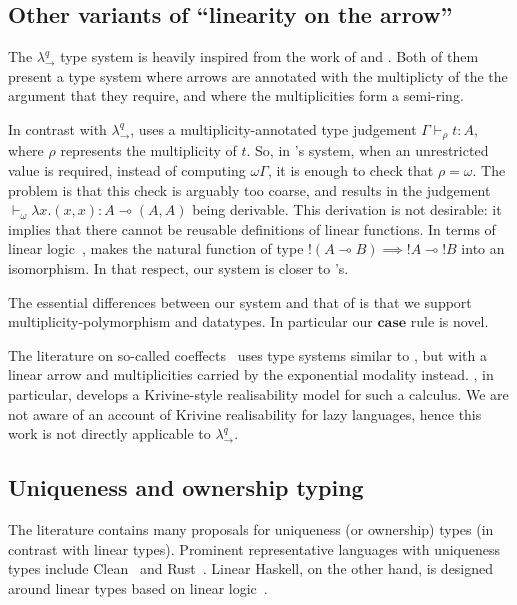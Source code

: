 \documentclass[acmsmall,screen]{acmart}\settopmatter{}
\newcommand\HaskeLL{Linear Haskell\xspace{}}
\newcommand\calc{{\ensuremath{λ^q_\to}}}
\begin{document}
\subsection{Other variants of ``linearity on the arrow''}
\label{sec:related-type-systems}

The \calc{} type system is heavily inspired from the work of
\citet{ghica_bounded_2014} and \citet{mcbride_rig_2016}. Both of them
present a type system where arrows are annotated with the multiplicty
of the the argument that they require, and where the multiplicities
form a semi-ring.

In contrast with \calc, \citeauthor{mcbride_rig_2016} uses a
multiplicity-annotated type judgement $Γ ⊢_ρ t : A$, where $ρ$
represents the multiplicity of $t$. So, in
\citeauthor{mcbride_rig_2016}'s system, when an unrestricted value is
required, instead of computing $ωΓ$, it is enough to check that
$ρ=ω$. The problem is that this check is arguably too coarse, and
results in the judgement $⊢_ω λx. (x,x) : A ⊸ (A,A)$ being derivable.
%
This derivation is not desirable: it implies that there cannot be
reusable definitions of linear functions. In terms of linear logic~\cite{girard_linear_1987},
\citeauthor{mcbride_rig_2016} makes the natural function of type $!(A⊸B) ⟹ !A⊸!B$
into an isomorphism.
In that respect, our system is closer to
\citeauthor{ghica_bounded_2014}'s.

The essential differences between our system and that of
\citeauthor{ghica_bounded_2014} is that we support
multiplicity-polymorphism and datatypes. In particular our \ensuremath{\mathbf{case}} rule
is novel.

The literature on so-called
coeffects~\cite{petricek_coeffects_2013,brunel_coeffect_core_2014}
uses type systems similar to \citeauthor{ghica_bounded_2014}, but
with a linear arrow and multiplicities carried by the exponential
modality instead. , in particular,
develops a Krivine-style realisability model for such a calculus. We are not
aware of an account of Krivine realisability for lazy languages, hence
this work is not directly applicable to \calc.

\subsection{Uniqueness and ownership typing}
\label{sec:uniqueness}

The literature
contains many proposals for uniqueness (or ownership) types (in contrast with
linear types).
Prominent representative languages with uniqueness types include
Clean~\cite{barendsen_uniqueness_1993} and
Rust~\cite{matsakis_rust_2014}. \HaskeLL, on the other hand, is
designed around linear types based on linear
logic~\cite{girard_linear_1987}.
\end{document}
